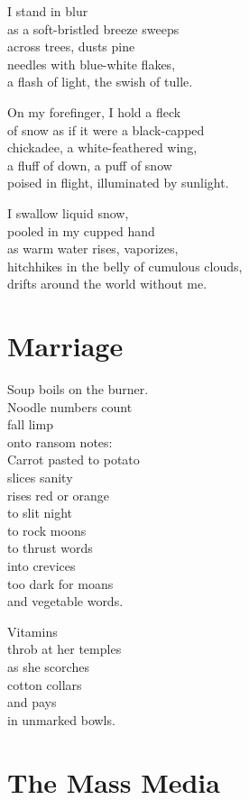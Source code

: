 \documentclass[twoside,10pt]{book}
\begin{document}
I stand in blur\\
as a soft-bristled breeze sweeps\\
across trees, dusts pine\\
needles with blue-white flakes,\\
a flash of light, the swish of tulle.

On my forefinger, I hold a fleck\\
of snow as if it were a black-capped\\
chickadee, a white-feathered wing,\\
a fluff of down, a puff of snow\\
poised in flight, illuminated by sunlight.

I swallow liquid snow,\\
pooled in my cupped hand\\
as warm water rises, vaporizes,\\
hitchhikes in the belly of cumulous clouds,\\
drifts around the world without me.


\clearpage
\section{Marriage}

Soup boils on the burner.\\
Noodle numbers count\\
fall limp\\
onto ransom notes:\\
Carrot pasted to potato\\
slices sanity\\
rises red or orange\\
to slit night\\
to rock moons\\
to thrust words\\
into crevices\\
too dark for moans\\
and vegetable words.

Vitamins\\
throb at her temples\\
as she scorches\\
cotton collars\\
and pays\\
in unmarked bowls.


\clearpage
\section{The Mass Media}
\end{document}
